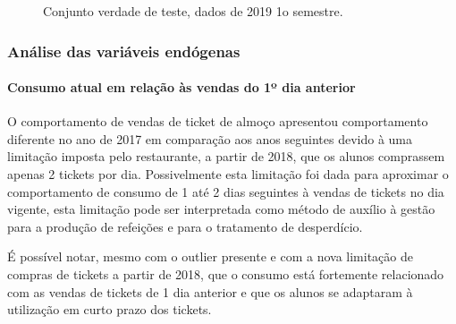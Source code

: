 \documentclass[	12pt, Times, openright, twoside, a4paper, english, brazil]{abntex2}
\begin{document}
                    \begin{figure}[!ht]
                    	\caption{Conjunto verdade de teste, dados de 2019 1o semestre. \label{fig:case1_train} }
                    \end{figure}
                    
    	    \subsubsection{Análise das variáveis endógenas}
    	        \paragraph{Consumo atual em relação às vendas do 1º dia anterior}
        	        O comportamento de vendas de ticket de almoço apresentou comportamento diferente no ano de 2017 em comparação aos anos seguintes devido à uma limitação imposta pelo restaurante, a partir de 2018, que os alunos comprassem apenas 2 tickets por dia. Possivelmente esta limitação foi dada para aproximar o comportamento de consumo de 1 até 2 dias seguintes à vendas de tickets no dia vigente, esta limitação pode ser interpretada como método de auxílio à gestão para a produção de refeições e para o tratamento de desperdício.
        	        
        	        É possível notar, mesmo com o outlier presente e com a nova limitação de compras de tickets a partir de 2018, que o consumo está fortemente relacionado com as vendas de tickets de 1 dia anterior e que os alunos se adaptaram à utilização em curto prazo dos tickets.
        	        
\end{document}
